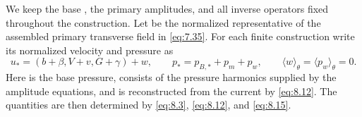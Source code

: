 We keep the base , the primary amplitudes, and all inverse operators
fixed throughout the construction. Let
 be the normalized representative of the
assembled primary transverse field in \eqref{eq:7.35}. For each finite construction write its
normalized velocity and pressure as
\begin{equation}
u_*=(b+\beta,V+v,G+\gamma)+w,
\qquad
p_*=p_{B,*}+p_m+p_w,
\qquad
\langle w\rangle_\theta=\langle p_w\rangle_\theta=0.
\tag{9.7}\label{eq:9.7}
\end{equation}
Here  is the base pressure,
 consists of the pressure harmonics supplied by the amplitude equations,
and  is reconstructed from the current
 by \eqref{eq:8.12}. The quantities
 are then determined by
\eqref{eq:8.3}, \eqref{eq:8.12}, and \eqref{eq:8.15}.

